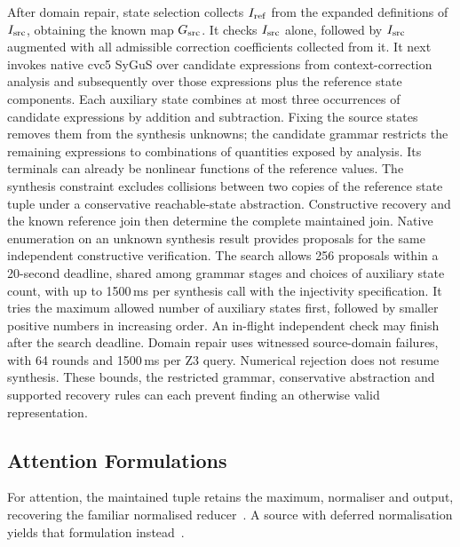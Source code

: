 \documentclass[acmsmall,screen,review,anonymous,nonacm]{acmart}
\begin{document}
After domain repair, state selection collects $I_{\mathrm{ref}}$ from the expanded definitions of $I_{\mathrm{src}}$, obtaining the known map $G_{\mathrm{src}}$.
It checks $I_{\mathrm{src}}$ alone, followed by $I_{\mathrm{src}}$ augmented with all admissible correction coefficients collected from it.
It next invokes native cvc5 SyGuS over candidate expressions from context-correction analysis and subsequently over those expressions plus the reference state components.
Each auxiliary state combines at most three occurrences of candidate expressions by addition and subtraction.
Fixing the source states removes them from the synthesis unknowns; the candidate grammar restricts the remaining expressions to combinations of quantities exposed by analysis.
Its terminals can already be nonlinear functions of the reference values.
The synthesis constraint excludes collisions between two copies of the reference state tuple under a conservative reachable-state abstraction.
Constructive recovery and the known reference join then determine the complete maintained join.
Native enumeration on an unknown synthesis result provides proposals for the same independent constructive verification.
The search allows 256 proposals within a 20-second deadline, shared among grammar stages and choices of auxiliary state count, with up to 1500\,ms per synthesis call with the injectivity specification.
It tries the maximum allowed number of auxiliary states first, followed by smaller positive numbers in increasing order.
An in-flight independent check may finish after the search deadline.
Domain repair uses witnessed source-domain failures, with 64 rounds and 1500\,ms per Z3 query.
Numerical rejection does not resume synthesis.
These bounds, the restricted grammar, conservative abstraction and supported recovery rules can each prevent finding an otherwise valid representation.

\subsection{Attention Formulations}
For attention, the maintained tuple retains the maximum, normaliser and output, recovering the familiar normalised reducer~\citep{flashattention}.
A source with deferred normalisation yields that formulation instead~\citep{flashattention2}.

\newpage

\end{document}
